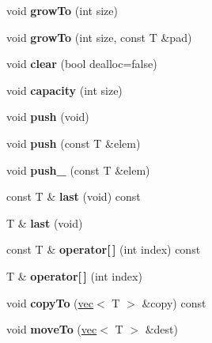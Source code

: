 \begin{DoxyCompactItemize}
\item 
\hypertarget{classvec_a1c93ecfe4c7dd5a14e3f6747defc5214}{void {\bfseries grow\-To} (int size)}\label{classvec_a1c93ecfe4c7dd5a14e3f6747defc5214}

\item 
\hypertarget{classvec_adc0e0d7b74d85ca5ab67c7c6c1869efa}{void {\bfseries grow\-To} (int size, const \-T \&pad)}\label{classvec_adc0e0d7b74d85ca5ab67c7c6c1869efa}

\item 
\hypertarget{classvec_aaeb8f9c6aeb9b7f362073bfce6f20486}{void {\bfseries clear} (bool dealloc=false)}\label{classvec_aaeb8f9c6aeb9b7f362073bfce6f20486}

\item 
\hypertarget{classvec_a646f0749c822e6b8a786c3e229f6a788}{void {\bfseries capacity} (int size)}\label{classvec_a646f0749c822e6b8a786c3e229f6a788}

\item 
\hypertarget{classvec_ac03ca2337b75cbe109cfa5ce4e4c505e}{void {\bfseries push} (void)}\label{classvec_ac03ca2337b75cbe109cfa5ce4e4c505e}

\item 
\hypertarget{classvec_a121e65e4409d59a5854175fb4092c82d}{void {\bfseries push} (const \-T \&elem)}\label{classvec_a121e65e4409d59a5854175fb4092c82d}

\item 
\hypertarget{classvec_ad25c48d3f6427a2c910404a8d06e7b51}{void {\bfseries push\-\_\-} (const \-T \&elem)}\label{classvec_ad25c48d3f6427a2c910404a8d06e7b51}

\item 
\hypertarget{classvec_a33907ee4dba8edef552608c171bd5f87}{const \-T \& {\bfseries last} (void) const }\label{classvec_a33907ee4dba8edef552608c171bd5f87}

\item 
\hypertarget{classvec_a623b879c190a8509868251428e0ac269}{\-T \& {\bfseries last} (void)}\label{classvec_a623b879c190a8509868251428e0ac269}

\item 
\hypertarget{classvec_a776f5a82db0fc4f64b4a4c054637a0f3}{const \-T \& {\bfseries operator\mbox{[}$\,$\mbox{]}} (int index) const }\label{classvec_a776f5a82db0fc4f64b4a4c054637a0f3}

\item 
\hypertarget{classvec_a3582e28bfea2633f6e52e020d961517c}{\-T \& {\bfseries operator\mbox{[}$\,$\mbox{]}} (int index)}\label{classvec_a3582e28bfea2633f6e52e020d961517c}

\item 
\hypertarget{classvec_a1819d681335776078137465f94398552}{void {\bfseries copy\-To} (\hyperlink{classvec}{vec}$<$ \-T $>$ \&copy) const }\label{classvec_a1819d681335776078137465f94398552}

\item 
\hypertarget{classvec_a811e183dc0b778233946c5bc9ed9487f}{void {\bfseries move\-To} (\hyperlink{classvec}{vec}$<$ \-T $>$ \&dest)}\label{classvec_a811e183dc0b778233946c5bc9ed9487f}

\end{DoxyCompactItemize}
